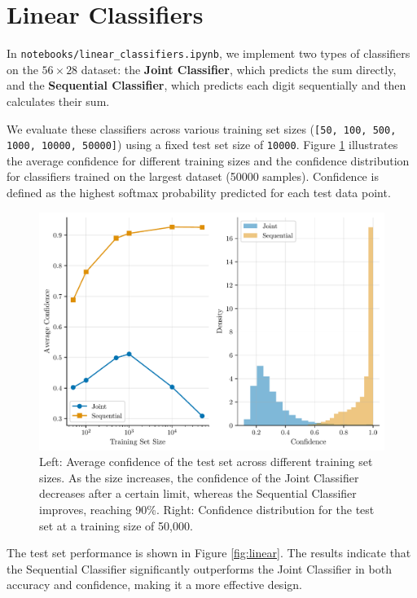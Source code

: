 \documentclass{article}
\begin{document}
\section{Linear Classifiers}

In \texttt{notebooks/linear\_classifiers.ipynb}, we implement two types of classifiers on the $56\times 28$ dataset: the \textbf{Joint Classifier}, which predicts the sum directly, and the \textbf{Sequential Classifier}, which predicts each digit sequentially and then calculates their sum.

We evaluate these classifiers across various training set sizes (\texttt{[50, 100, 500, 1000, 10000, 50000]}) using a fixed test set size of \texttt{10000}. Figure \ref{fig:confidence} illustrates the average confidence for different training sizes and the confidence distribution for classifiers trained on the largest dataset (50000 samples). Confidence is defined as the highest softmax probability predicted for each test data point.

\begin{figure}[!htbp]
    \centering
    \includegraphics[width=0.8\linewidth]{./images/confidence_analysis.pdf}
    \caption{Left: Average confidence of the test set across different training set sizes. As the size increases, the confidence of the Joint Classifier decreases after a certain limit, whereas the Sequential Classifier improves, reaching 90\%. Right: Confidence distribution for the test set at a training size of 50,000.}
\label{fig:confidence}
\end{figure}

The test set performance is shown in Figure \ref{fig:linear}. The results indicate that the Sequential Classifier significantly outperforms the Joint Classifier in both accuracy and confidence,  making it a more effective design.
\end{document}
